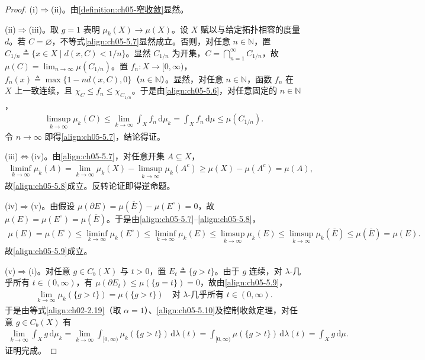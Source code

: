 \documentclass[../../main.tex]{subfiles}%
\begin{document}
\begin{proof}
(i)$\Rightarrow$(ii)。由\cref{definition:ch05-窄收敛}显然。

(ii)$\Rightarrow$(iii)。取 $g=1$ 表明 $\mu_k(X)\to\mu(X)$。设 $X$ 赋以与给定拓扑相容的度量 $d$。若 $C=\varnothing $，不等式\eqref{align:ch05-5.7}显然成立。否则，对任意 $n\in\mathbb{N}$，置 $C_{1/n}\triangleq \{x\in X\mid d(x,C)<1/n\}$。显然 $C_{1/n}$ 为开集，$C=\bigcap_{n=1}^\infty C_{1/n}$，故 $\mu(C)=\lim_{n\to\infty}\mu(C_{1/n})$。置 $f_n:X\to[0,\infty)$，$f_n(x)\triangleq \max\{1-nd(x,C),0\}$（$n\in\mathbb{N}$）。显然，对任意 $n\in\mathbb{N}$，函数 $f_n$ 在 $X$ 上一致连续，且 $\chi_C\leqslant f_n\leqslant\chi_{C_{1/n}}$。于是由\eqref{align:ch05-5.6}，对任意固定的 $n\in\mathbb{N}$，
\begin{align*}
\limsup_{k\to\infty}\mu_k(C)
\leqslant\lim_{k\to\infty}\int_X f_n\,\mathrm{d}\mu_k
=\int_X f_n\,\mathrm{d}\mu\leqslant\mu(C_{1/n}).
\end{align*}
令 $n\to\infty$ 即得\eqref{align:ch05-5.7}，结论得证。

(iii)$\Leftrightarrow$(iv)。由\eqref{align:ch05-5.7}，对任意开集 $A\subseteq X$，
\begin{align*}
\liminf_{k\to\infty}\mu_k(A)
=\lim_{k\to\infty}\mu_k(X)-\limsup_{k\to\infty}\mu_k(A^c)
\geqslant\mu(X)-\mu(A^c)=\mu(A),
\end{align*}
故\eqref{align:ch05-5.8}成立。反转论证即得逆命题。

(iv)$\Rightarrow$(v)。由假设 $\mu(\partial E)=\mu(\overline{E})-\mu(E^\circ)=0$，故 $\mu(E)=\mu(E^\circ)=\mu(\overline{E})$。于是由\eqref{align:ch05-5.7}–\eqref{align:ch05-5.8}，
\begin{align*}
\mu(E)=\mu(E^\circ)
\leqslant\liminf_{k\to\infty}\mu_k(E^\circ)
\leqslant\liminf_{k\to\infty}\mu_k(E)
\leqslant\limsup_{k\to\infty}\mu_k(E)
\leqslant\limsup_{k\to\infty}\mu_k(\overline{E})
\leqslant\mu(\overline{E})=\mu(E).
\end{align*}
故\eqref{align:ch05-5.9}成立。

(v)$\Rightarrow$(i)。对任意 $g\in C_b(X)$ 与 $t>0$，置 $E_t\triangleq \{g>t\}$。由于 $g$ 连续，对 $\lambda$-几乎所有 $t\in(0,\infty)$，有 $\mu(\partial E_t)\leqslant\mu(\{g=t\})=0$，故由\eqref{align:ch05-5.9}，
\begin{align}
\lim_{k\to\infty}\mu_k(\{g>t\})=\mu(\{g>t\})
\quad\text{对 }\lambda\text{-几乎所有 }t\in(0,\infty).\label{align:ch05-5.10}
\end{align}
于是由等式\eqref{align:ch02-2.19}（取 $\alpha=1$）、\eqref{align:ch05-5.10}及控制收敛定理，对任意 $g\in C_b(X)$ 有
\begin{align*}
\lim_{k\to\infty}\int_X g\,\mathrm{d}\mu_k
=\lim_{k\to\infty}\int_{[0,\infty)}\mu_k(\{g>t\})\,\mathrm{d}\lambda(t)
=\int_{[0,\infty)}\mu(\{g>t\})\,\mathrm{d}\lambda(t)
=\int_X g\,\mathrm{d}\mu.
\end{align*}
证明完成。
\end{proof}
\end{document}

